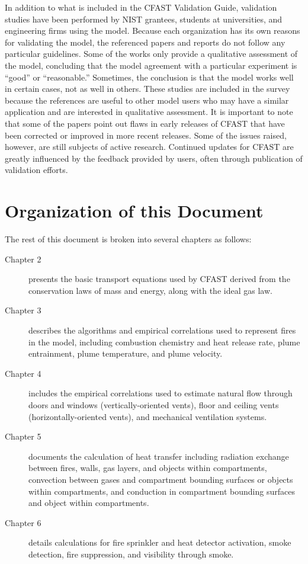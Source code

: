 \documentclass[12pt,twoside]{book}
\begin{document}
In addition to what is included in the CFAST Validation Guide, validation studies have been performed by NIST grantees, students at universities, and engineering firms using the model.  Because each organization has its  own reasons for  validating the model, the  referenced papers and reports do not follow any particular guidelines. Some of the works only provide  a qualitative assessment  of the model,  concluding that the  model  agreement with  a  particular  experiment  is ``good''  or ``reasonable.'' Sometimes, the conclusion is that the model works well in certain cases, not as well in others. These studies are included in the survey because the references  are useful to other model users who may have a similar application  and are interested in qualitative assessment. It is important to note  that some of the papers point out flaws in early releases of CFAST that have been corrected or improved in more recent  releases. Some of  the issues raised, however,  are still subjects of  active research. Continued updates for CFAST  are greatly influenced by the feedback provided by users, often through publication of validation efforts.

\section{Organization of this Document}

The rest of this document is broken into several chapters as follows:

\begin{description}
\item[Chapter 2] presents the basic transport equations used by CFAST derived from the conservation laws of mass and energy, along with the ideal gas law.
\item[Chapter 3] describes the algorithms and empirical correlations used to represent fires in the model, including combustion chemistry and heat release rate, plume entrainment, plume temperature, and plume velocity.
\item[Chapter 4] includes the empirical correlations used to estimate natural flow through doors and windows (vertically-oriented vents), floor and ceiling vents (horizontally-oriented vents), and mechanical ventilation systems.
\item[Chapter 5] documents the calculation of heat transfer including radiation exchange between fires, walls, gas layers, and objects within compartments, convection between gases and compartment bounding surfaces or objects within compartments, and conduction in compartment bounding surfaces and object within compartments.
\item[Chapter 6] details calculations for fire sprinkler and heat detector activation, smoke detection, fire suppression, and visibility through smoke.
\end{description}
\end{document}
